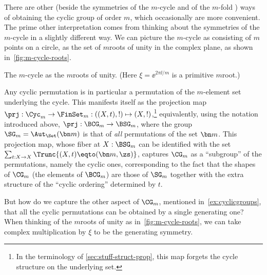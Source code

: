 \begin{example}
\label{ex:Cm}
There are other (beside the symmetries of the $m$-cycle and of the $m$-fold \covering) ways of obtaining the cyclic group of order $m$, which occasionally are more convenient.
The prime other interpretation comes from thinking about the symmetries of the $m$-cycle in a slightly different way.
We can picture the $m$-cycle as consisting of $m$ points on a circle,
\eg as the set of $m$\th roots of unity in the complex plane, as shown in~\cref{fig:m-cycle-roots}.
\begin{marginfigure}
  \caption{The $m$-cycle as the $m$\th roots of unity.
    (Here $\xi=\ee^{2\pi\ii/m}$ is a primitive $m$\th root.)}
  \label{fig:m-cycle-roots}
\end{marginfigure}
Any cyclic permutation is in particular a permutation 
of the $m$-element set underlying the cycle.
This manifests itself as the projection map 
$\prj : \Cyc_m \to \FinSet_m : ((X,t),!) \mapsto (X,!)$,\footnote{%
  In the terminology of \cref{sec:stuff-struct-prop},
  this map forgets the cycle structure on the underlying set.}
equivalently, using the notation introduced above, $\prj : \BCG_m \to \BSG_m$,
where the group $\SG_m=\Aut_\Set(\bn m)$ is that of
\emph{all} permutations of the set $\bn m$.
This projection map,
whose fiber at $X : \BSG_m$ can be identified with
the set $\sum_{t:X\to X}\Trunc{(X,t)\eqto(\bn m,\zs)}$,
captures $\CG_m$ as a ``subgroup'' of the permutations, 
namely the cyclic ones, corresponding to the fact that the 
shapes of $\CG_m$ (\ie the elements of $\BCG_m$)
are those of $\SG_m$ together with the extra structure of 
the ``cyclic ordering'' determined by $t$.

But how do we capture the other aspect of $\CG_m$,
mentioned in~\cref{ex:cyclicgroups},
that all the cyclic permutations can be obtained by a single generating one?
When thinking of the $m$\th roots of unity as in~\cref{fig:m-cycle-roots},
we can take complex multiplication by $\xi$ to be the generating symmetry.


\end{example}
